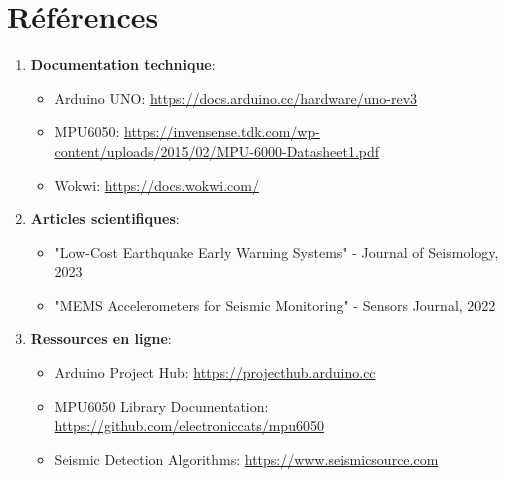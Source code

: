 \documentclass[12pt,a4paper]{article}
\begin{document}
\section{Références}
\begin{enumerate}
\item \textbf{Documentation technique}:
\begin{itemize}
\item Arduino UNO: \url{https://docs.arduino.cc/hardware/uno-rev3}
\item MPU6050: \url{https://invensense.tdk.com/wp-content/uploads/2015/02/MPU-6000-Datasheet1.pdf}
\item Wokwi: \url{https://docs.wokwi.com/}
\end{itemize}

\item \textbf{Articles scientifiques}:
\begin{itemize}
\item "Low-Cost Earthquake Early Warning Systems" - Journal of Seismology, 2023
\item "MEMS Accelerometers for Seismic Monitoring" - Sensors Journal, 2022
\end{itemize}

\item \textbf{Ressources en ligne}:
\begin{itemize}
\item Arduino Project Hub: \url{https://projecthub.arduino.cc}
\item MPU6050 Library Documentation: \url{https://github.com/electroniccats/mpu6050}
\item Seismic Detection Algorithms: \url{https://www.seismicsource.com}
\end{itemize}
\end{enumerate}
\end{document}
